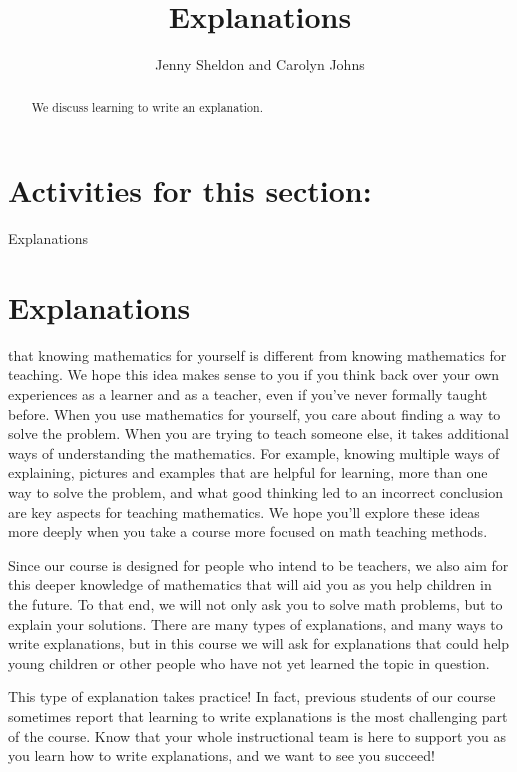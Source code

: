 \documentclass[noauthor,nooutcomes]{ximera}
\title{Explanations}
\author{Jenny Sheldon and Carolyn Johns}
\begin{document}
\begin{abstract}
We discuss learning to write an explanation.
\end{abstract}
\maketitle

\section{Activities for this section:} Explanations


\section{Explanations}



  that knowing mathematics for yourself is different from knowing mathematics for teaching. We hope this idea makes sense to you if you think back over your own experiences as a learner and as a teacher, even if you've never formally taught before. When you use mathematics for yourself, you care about finding a way to solve the problem. When you are trying to teach someone else, it takes additional ways of understanding the mathematics. For example, knowing multiple ways of explaining, pictures and examples that are helpful for learning, more than one way to solve the problem, and what good thinking led to an incorrect conclusion are key aspects for teaching mathematics. We hope you'll explore these ideas more deeply when you take a course more focused on math teaching methods.

Since our course is designed for people who intend to be teachers, we also aim for this deeper knowledge of mathematics that will aid you as you help children in the future. To that end, we will not only ask you to solve math problems, but to explain your solutions. There are many types of explanations, and many ways to write explanations, but in this course we will ask for explanations that could help young children or other people who have not yet learned the topic in question.

This type of explanation takes practice! In fact, previous students of our course sometimes report that learning to write explanations is the most challenging part of the course. Know that your whole instructional team is here to support you as you learn how to write explanations, and we want to see you succeed!
\end{document}
